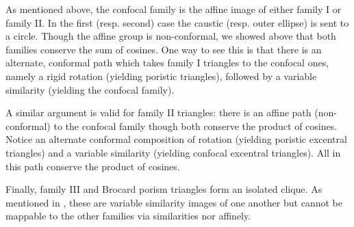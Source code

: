 As mentioned above, the confocal family is the affine image of either family I or family II. In the first (resp. second) case the caustic (resp. outer ellipse) is sent to a circle. Though the affine group is non-conformal, we showed above that both families conserve the sum of cosines. One way to see this is that there is an alternate, conformal path which takes family I triangles to the confocal ones, namely a rigid rotation (yielding poristic triangles), followed by a variable similarity (yielding the confocal family).

A similar argument is valid for family II triangles: there is an affine path (non-conformal) to the confocal family though both conserve the product of cosines. Notice an alternate conformal composition of rotation (yielding poristic excentral triangles) and a variable similarity (yielding confocal excentral triangles). All in this path conserve the product of cosines.

Finally, family III and Brocard porism triangles form an isolated clique. As mentioned in \cite{reznik2020-similarityII}, these are variable similarity images of one another but cannot be mappable to the other families via similarities nor affinely.



